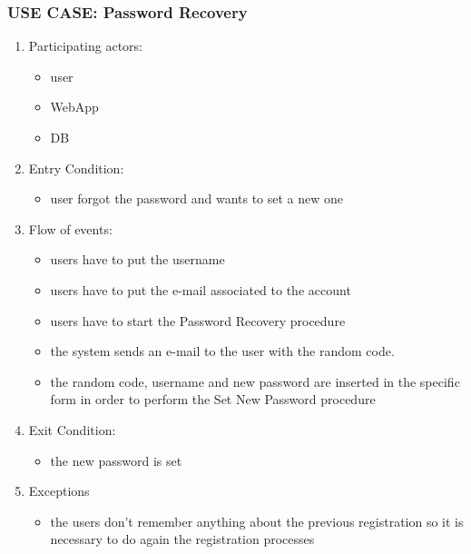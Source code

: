 \documentclass{article}
\begin{document}
\subsubsection{\textbf{USE CASE}: Password Recovery}
\begin{enumerate}
\item Participating actors: 
\begin{itemize}
    \item user
    \item WebApp
    \item DB
\end{itemize}
\item Entry Condition: 
\begin{itemize}
    \item user forgot the password and wants to set a new one
\end{itemize}
\item Flow of events: 
\begin{itemize}
    \item users have to put the username 
    \item users have to put the e-mail associated to the account 
    \item users have to start the Password Recovery procedure
    \item the system sends an e-mail to the user with the random code.
    \item the random code, username and new password are inserted in the specific form in order to perform the Set New Password procedure
\end{itemize}
\item Exit Condition: 
\begin{itemize}
    \item the new password is set
\end{itemize}
\item Exceptions
\begin{itemize}
    \item the users don’t remember anything about the previous registration so it is necessary to do again the registration processes
\end{itemize}
\end{enumerate}
\end{document}
